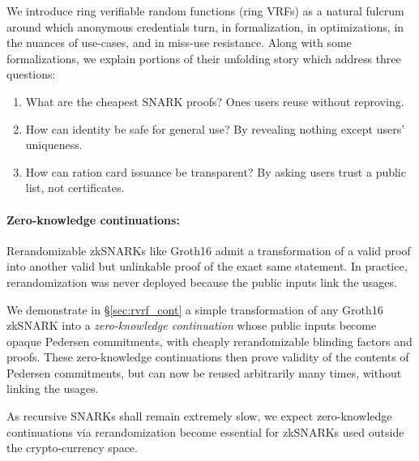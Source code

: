 
\def\qaudbreak{\eprint{\quad}{\\}}

We introduce ring verifiable random functions (ring VRFs) as a natural
fulcrum around which anonymous credentials turn, in formalization,
in optimizations, in the nuances of use-cases, and in miss-use resistance.
%
Along with some formalizations, we explain portions of their unfolding
story which address three questions:
\begin{enumerate} 
\item
What are the cheapest SNARK proofs?  \qaudbreak
Ones users reuse without reproving.
\item
How can identity be safe for general use?  \qaudbreak
By revealing nothing except users' uniqueness.
\item
How can ration card issuance be transparent?  \qaudbreak
By asking users trust a public list, not certificates.
\end{enumerate}

\paragraph{Zero-knowledge continuations:}

Rerandomizable zkSNARKs like Groth16 \cite{Groth16} admit a
transformation of a valid proof into another valid but unlinkable
proof of the exact same statement.  In practice, rerandomization
was never deployed because the public inputs link the usages.

We demonstrate in \S\ref{sec:rvrf_cont} a simple transformation of
any Groth16 zkSNARK into a {\it zero-knowledge continuation} whose
public inputs become opaque Pedersen commitments, with cheaply
rerandomizable blinding factors and proofs.
These zero-knowledge continuations then prove validity of the contents
of Pedersen commitments, but can now be reused arbitrarily many times,
without linking the usages. 

As recursive SNARKs shall remain extremely slow,
we expect zero-knowledge continuations via rerandomization become
essential for zkSNARKs used outside the crypto-currency space.

